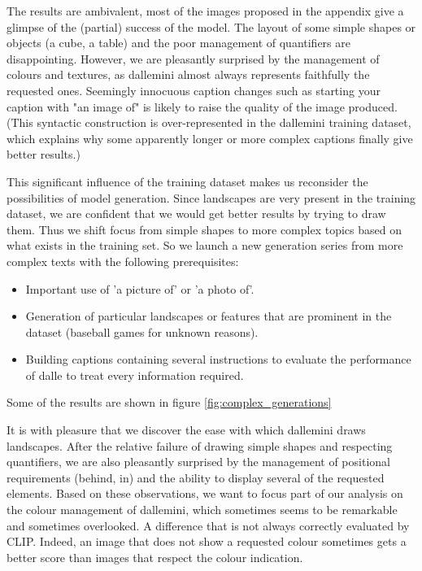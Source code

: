 \documentclass{article}
\begin{document}
\begin{multicols}{2}
The results are ambivalent, most of the images proposed in the appendix give a glimpse of the (partial) success of the model. The layout of some simple shapes or objects (a cube, a table) and the poor management of quantifiers are disappointing.
However, we are pleasantly surprised by the management of colours and textures, as \gls{dallemini} almost always represents faithfully the requested ones.
Seemingly innocuous caption changes such as starting your caption with "an image of" is likely to raise the quality of the image produced.
(This syntactic construction is over-represented in the \gls{dallemini} training dataset, which explains why some apparently longer or more complex captions finally give better results.)

This significant influence of the training dataset makes us reconsider the possibilities of model generation. Since landscapes are very present in the training dataset, we are confident that we would get better results by trying to draw them.
Thus we shift focus from simple shapes to more complex topics based on what exists in the training set.
So we launch a new generation series from more complex texts with the following prerequisites:
\begin{itemize}
    \item Important use of 'a picture of' or 'a photo of'.
    \item Generation of particular landscapes or features that are prominent in the dataset (baseball games for unknown reasons).
    \item Building captions containing several instructions to evaluate the performance of \gls{dalle} to treat every information required.
\end{itemize}

Some of the results are shown in figure \ref{fig:complex_generations}

It is with pleasure that we discover the ease with which \gls{dallemini} draws landscapes. After the relative failure of drawing simple shapes and respecting quantifiers, we are also pleasantly surprised by the management of positional requirements (behind, in) and the ability to display several of the requested elements. Based on these observations, we want to focus part of our analysis on the colour management of \gls{dallemini}, which sometimes seems to be remarkable and sometimes overlooked. A difference that is not always correctly evaluated by CLIP. Indeed, an image that does not show a requested colour sometimes gets a better score than images that respect the colour indication.


\end{multicols}
\end{document}
